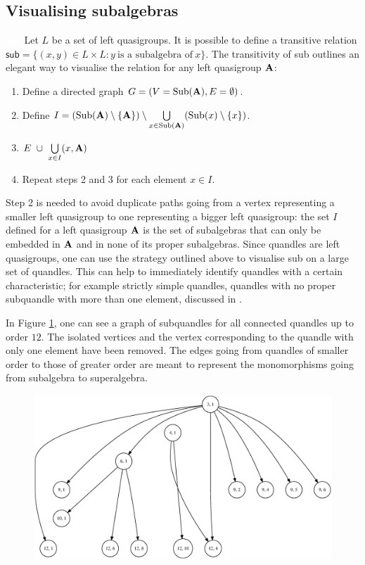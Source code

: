 \subsection{Visualising subalgebras}\textcolor{white}{line}\newline
Let $L$ be a set of left quasigroups.\newline
It is possible to define a transitive relation $\textsf{sub} = \{(x, y) \in L\times L: y~\text{is a subalgebra of}~x\}$. The transitivity of \textsf{sub} outlines an elegant way to visualise the relation for any left quasigroup $\mathbf{A}$:
\begin{enumerate}
    \item Define a directed graph $G = (V = \operatorname{Sub}(\mathbf{A}), E = \emptyset)$.
    \item Define $I = (\operatorname{Sub}(\mathbf{A})\setminus \{\mathbf{A}\})\setminus \bigcup\limits_{x\in \operatorname{Sub}(\mathbf{A})} (\operatorname{Sub}(x) \setminus \{x\})$.
    \item $E~\cup~\bigcup\limits_{x \in I} (x,\mathbf{A})$
    \item Repeat steps 2 and 3 for each element $x \in I$.
\end{enumerate}
\noindent Step 2 is needed to avoid duplicate paths going from a vertex representing a smaller left quasigroup to one representing a bigger left quasigroup: the set $I$ defined for a left quasigroup $\mathbf{A}$ is the set of subalgebras that can only be embedded in $\mathbf{A}$ and in none of its proper subalgebras.\newline
\noindent Since quandles are left quasigroups, one can use the strategy outlined above to visualise \textsf{sub} on a large set of quandles. This can help to immediately identify quandles with a certain characteristic; for example strictly simple quandles, quandles with no proper subquandle with more than one element, discussed in \cite{bonatto2020principal}.

In Figure \ref{fig:subqgraph}, one can see a graph of subquandles for all connected quandles up to order $12$. The isolated vertices and the vertex corresponding to the quandle with only one element have been removed. The edges going from quandles of smaller order to those of greater order are meant to represent the monomorphisms going from subalgebra to superalgebra.

   
\begin{figure}[H]
    \centering
    \includegraphics[scale = 0.4]{Thesis/images/SubQuandle1.eps}
    \caption{}
    \label{fig:subqgraph}
\end{figure}

